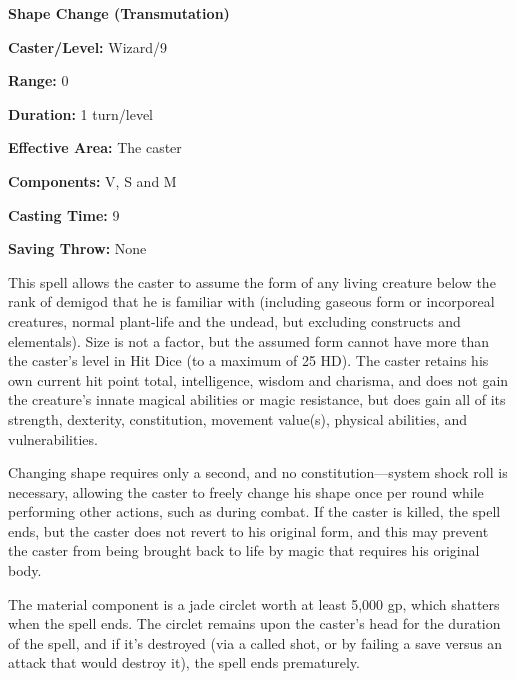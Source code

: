 \begin{multicols}{2}
\vspace{1em}

\noindent
\begin{minipage}{\columnwidth}

\noindent \textbf{Shape Change (Transmutation)}

\noindent \textbf{Caster/Level:} Wizard/9

\noindent \textbf{Range:} 0

\noindent \textbf{Duration:} 1 turn/level

\noindent \textbf{Effective Area:} The caster

\noindent \textbf{Components:} V, S and M

\noindent \textbf{Casting Time:} 9

\noindent \textbf{Saving Throw:} None

\end{minipage}

This spell allows the caster to assume the form of any living creature below the rank of demigod that he is familiar with (including gaseous form or incorporeal creatures, normal plant-life and the undead, but excluding constructs and elementals).  Size is not a factor, but the assumed form cannot have more than the caster's level in Hit Dice (to a maximum of 25 HD).  The caster retains his own current hit point total, intelligence, wisdom and charisma, and does not gain the creature's innate magical abilities or magic resistance, but does gain all of its strength, dexterity, constitution, movement value(s), physical abilities, and vulnerabilities.  

Changing shape requires only a second, and no constitution---system shock roll is necessary, allowing the caster to freely change his shape once per round while performing other actions, such as during combat.  If the caster is killed, the spell ends, but the caster does not revert to his original form, and this may prevent the caster from being brought back to life by magic that requires his original body.

The material component is a jade circlet worth at least 5,000 gp, which shatters when the spell ends.  The circlet remains upon the caster's head for the duration of the spell, and if it's destroyed (via a called shot, or by failing a save versus an attack that would destroy it), the spell ends prematurely.

\vspace{1em}

\noindent
\begin{minipage}{\columnwidth}


\end{minipage}
\end{multicols}
